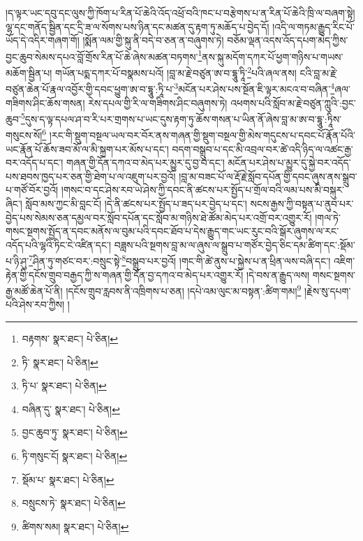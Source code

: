 །ད་ལྟར་ཡང་དབུ་དང་ལུས་ཀྱི་ཁོག་པ་རིན་པོ་ཆེའི་འོད་འཕྲོ་བའི་ཁང་པ་བརྩེགས་པ་ན་རིན་པོ་ཆེའི་ཁྲི་ལ་བཞག་སྟེ། ལྷ་དང་གནོད་སྦྱིན་དང་དྲི་ཟ་ལ་སོགས་པས་ཉིན་དང་མཚན་དུ་རྟག་ཏུ་མཆོད་པ་བྱེད་དོ། །འདི་ལ་གཏམ་རྒྱུད་རིང་པོ་ཡོད་དེ་འདིར་གཞག་གོ། །སྨོན་ལམ་གྱི་སྐུ་ནི་བདེ་བ་ཅན་ན་བཞུགས་ཏེ། བཅོམ་ལྡན་འདས་འོད་དཔག་མེད་ཀྱིས་བྱང་ཆུབ་སེམས་དཔའ་བློ་གྲོས་རིན་པོ་ཆེ་ཞེས་མཚན་བཏགས་\footnote{བརྟགས་  སྣར་ཐང་།  པེ་ཅིན། }ནས་སྐུ་མདོག་དཀར་པོ་ཕྱག་གཉིས་པ་གཡས་མཆོག་སྦྱིན་པ། གཡོན་པདྨ་དཀར་པོ་བསྣམས་པའོ། །བླ་མ་རྗེ་བཙུན་ཨ་བ་དྷཱུ་ཏཱི་\footnote{ཏི་  སྣར་ཐང་།  པེ་ཅིན། }པའི་ཞལ་ནས། ངའི་བླ་མ་རྗེ་བཙུན་ཆེན་པོ་རྣལ་འབྱོར་གྱི་དབང་ཕྱུག་ཨ་བ་དྷཱུ་:ཏཱི་པ་\footnote{ཏི་པ་  སྣར་ཐང་།  པེ་ཅིན། }མངོན་པར་ཤེས་པས་སྔོན་ཇི་ལྟར་མངའ་བ་བཞིན་\footnote{བཞིན་དུ་  སྣར་ཐང་།  པེ་ཅིན། }ཞལ་གཟིགས་ཤིང་ཆོས་གསན། རེས་དཔལ་གྱི་རི་ལ་གཟིགས་ཤིང་བཞུགས་ཏེ། འཕགས་པའི་སློབ་མ་རྗེ་བཙུན་ཀླུའི་:བྱང་ཆུབ་\footnote{བྱང་ཆུབ་ཏུ་  སྣར་ཐང་།  པེ་ཅིན། }དུས་ད་ལྟ་དཔལ་ཤ་བ་རི་པར་གྲགས་པ་ཡང་དུས་རྟག་ཏུ་ཆོས་གསན་པ་ཡིན་ནོ་ཞེས་བླ་མ་ཨ་བ་དྷཱུ་:ཏཱིས་གསུངས་སོ།\footnote{ཏི་གསུང་ངོ།  སྣར་ཐང་།  པེ་ཅིན། } །རང་གི་སྡུག་བསྔལ་ཡལ་བར་བོར་ནས་གཞན་གྱི་སྡུག་བསྔལ་གྱི་མེས་གདུངས་པ་དབང་པོ་རྣོན་པོའི་ཡང་རྣོན་པོ་ཆོས་ཟབ་མོ་ལ་མི་སྐྲག་པར་མོས་པ་དང་། བདག་བསྒྲུབ་པ་དང་མི་འབྲལ་བར་ཚེ་འདི་ཉིད་ལ་འཚང་རྒྱ་བར་འདོད་པ་དང་། གཞན་གྱི་དོན་དཀའ་བ་མེད་པར་མྱུར་དུ་བྱ་བ་དང་། མངོན་པར་ཤེས་པ་མྱུར་དུ་སྐྱེ་བར་འདོད་པས་ཐབས་ཁྱད་པར་ཅན་གྱི་ཐེག་པ་ལ་འཇུག་པར་བྱའོ། །བླ་མ་བཟང་པོ་ལ་རྡོ་རྗེ་སློབ་དཔོན་གྱི་དབང་ཞུས་ནས་སྒྲུབ་པ་གཙོ་བོར་བྱའོ། །གསང་བ་དང་ཤེས་རབ་ཡེ་ཤེས་ཀྱི་དབང་ནི་ཚངས་པར་སྤྱོད་པ་གྲོལ་བའི་ལམ་པས་མི་བསྐུར་ཞིང་། སློབ་མས་ཀྱང་མི་བླང་ངོ། །དེ་ནི་ཚངས་པར་སྤྱོད་པ་ཟད་པར་བྱེད་པ་དང་། སངས་རྒྱས་ཀྱི་བསྟན་པ་ནུབ་པར་བྱེད་པས་སེམས་ཅན་དམྱལ་བར་སློབ་དཔོན་དང་སློབ་མ་གཉིས་ཐེ་ཚོམ་མེད་པར་འགྲོ་བར་འགྱུར་རོ། །གལ་ཏེ་གསང་སྔགས་སྤྱོད་ན་དབང་མནོས་ལ་བུམ་པའི་དབང་ཐོབ་པ་དེས་རྒྱུད་གང་ཡང་རུང་བའི་སྒོར་ཞུགས་ལ་རང་འདོད་པའི་ལྷའི་ཏིང་ངེ་འཛིན་དང་། བཟླས་པའི་སྔགས་བླ་མ་ལ་ཞུས་ལ་སྒྲུབ་པ་གཙོར་བྱེད་ཅིང་དམ་ཚིག་དང་:སྡོམ་པ་ཉི་ཤུ་\footnote{སྡོམ་པ་  སྣར་ཐང་།  པེ་ཅིན། }ཤིན་ཏུ་གཙང་བར་:བསྲུང་སྟེ་\footnote{བསྲུངས་ཏེ་  སྣར་ཐང་།  པེ་ཅིན། }བསྒྲུབ་པར་བྱའོ། །གང་གི་ཚེ་ནུས་པ་སྐྱེས་པ་ན་ཕྲིན་ལས་བཞི་དང་། འཇིག་རྟེན་གྱི་དངོས་གྲུབ་བརྒྱད་ཀྱི་ས་གཞན་གྱི་དོན་བྱ་དཀའ་བ་མེད་པར་འགྱུར་རོ། །དེ་བས་ན་རྒྱུད་ལས། གསང་སྔགས་རྒྱ་མཚོ་ཆེན་པོ་ནི། །དངོས་གྲུབ་རླབས་ནི་འཁྲིགས་པ་ཅན། །དཔེ་འམ་ལུང་མ་བསྟན་:ཚིག་གམ།\footnote{ཚིགས་སམ།  སྣར་ཐང་།  པེ་ཅིན། } །རྗེས་སུ་དཔག་པའི་ཤེས་རབ་ཀྱིས། །
